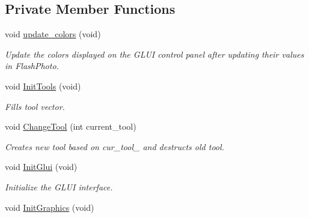 \subsection*{Private Member Functions}
\begin{DoxyCompactItemize}
\item 
void \hyperlink{classimage__tools_1_1FlashPhotoApp_a4d51fdabaff836fc55a4f72a465773e7}{update\+\_\+colors} (void)\hypertarget{classimage__tools_1_1FlashPhotoApp_a4d51fdabaff836fc55a4f72a465773e7}{}\label{classimage__tools_1_1FlashPhotoApp_a4d51fdabaff836fc55a4f72a465773e7}

\begin{DoxyCompactList}\small\item\em Update the colors displayed on the G\+L\+UI control panel after updating their values in Flash\+Photo. \end{DoxyCompactList}\item 
void \hyperlink{classimage__tools_1_1FlashPhotoApp_aed0c4adbe768ceeb3d75fd4888b9e477}{Init\+Tools} (void)\hypertarget{classimage__tools_1_1FlashPhotoApp_aed0c4adbe768ceeb3d75fd4888b9e477}{}\label{classimage__tools_1_1FlashPhotoApp_aed0c4adbe768ceeb3d75fd4888b9e477}

\begin{DoxyCompactList}\small\item\em Fills tool vector. \end{DoxyCompactList}\item 
void \hyperlink{classimage__tools_1_1FlashPhotoApp_aefddcbfbc4d435f618676f64a18e6538}{Change\+Tool} (int current\+\_\+tool)\hypertarget{classimage__tools_1_1FlashPhotoApp_aefddcbfbc4d435f618676f64a18e6538}{}\label{classimage__tools_1_1FlashPhotoApp_aefddcbfbc4d435f618676f64a18e6538}

\begin{DoxyCompactList}\small\item\em Creates new tool based on cur\+\_\+tool\+\_\+ and destructs old tool. \end{DoxyCompactList}\item 
void \hyperlink{classimage__tools_1_1FlashPhotoApp_a7e66fc64a72ba17648cb99491c773c9b}{Init\+Glui} (void)\hypertarget{classimage__tools_1_1FlashPhotoApp_a7e66fc64a72ba17648cb99491c773c9b}{}\label{classimage__tools_1_1FlashPhotoApp_a7e66fc64a72ba17648cb99491c773c9b}

\begin{DoxyCompactList}\small\item\em Initialize the G\+L\+UI interface. \end{DoxyCompactList}\item 
void \hyperlink{classimage__tools_1_1FlashPhotoApp_ac529b21d6c3466ed1b40cc159b172d0d}{Init\+Graphics} (void)\hypertarget{classimage__tools_1_1FlashPhotoApp_ac529b21d6c3466ed1b40cc159b172d0d}{}\label{classimage__tools_1_1FlashPhotoApp_ac529b21d6c3466ed1b40cc159b172d0d}


\end{DoxyCompactItemize}
